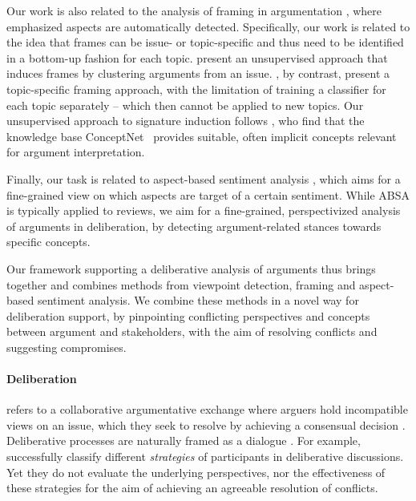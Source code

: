 Our work is also related to the analysis of framing in argumentation 
\citep{heinischetal:2022a,heinisch-etal-2023-unsupervised,otmakhova-etal-2024-media}, where emphasized aspects are automatically detected. %
Specifically, our work is related to the idea that frames %
can be issue- or topic-specific and thus need to be identified in a bottom-up fashion for each topic. 
\citet{ajjour-etal-2019-modeling} present an unsupervised approach that induces frames by clustering arguments from an issue. 
\citet{ruckdeschel-wiedemann-2022-boundary}, by contrast, present a topic-specific framing approach, with the limitation of training a classifier for each topic separately -- which then cannot be applied to new topics. 
Our unsupervised approach to signature induction follows \citet{plenz-etal-2024-pakt}, who find that the knowledge base ConceptNet~\citep{speer2017conceptnet} provides suitable, often implicit concepts relevant for argument interpretation. %

Finally, our task is related to aspect-based sentiment analysis \citep[ABSA; ][]{cabello-Akujuobi-2024-it,wang-etal-2024-refining,frasincar_2023,hoang-etal-2019-aspect}, which aims for a fine-grained view on which aspects are target of a certain sentiment. 
While ABSA is typically applied to reviews, we aim for a fine-grained, perspectivized analysis of arguments in deliberation, by detecting argument-related stances towards specific concepts. 

Our framework supporting a deliberative analysis of arguments thus brings together and combines methods from viewpoint detection, framing and aspect-based sentiment analysis. We combine these methods in a novel way for deliberation support, by pinpointing conflicting perspectives and concepts between argument and stakeholders, with the aim of resolving conflicts and suggesting compromises. 

\paragraph{Deliberation} 
refers to a collaborative argumentative exchange where arguers hold incompatible views on an issue, which they seek to resolve by achieving a consensual decision \citep{FELTON2022100350}. Deliberative processes are naturally framed as a dialogue \citep{waltonetal-2010-deliberation,snaith-etal-2010-mixed,Waltonetal-2016-deliberation}. %
For example, \citet{al-khatib-etal-2018-modeling} successfully classify different \textit{strategies} of participants
in deliberative discussions. Yet they do not evaluate the underlying perspectives, nor the effectiveness of these strategies for the aim of achieving an agreeable resolution of conflicts. 



